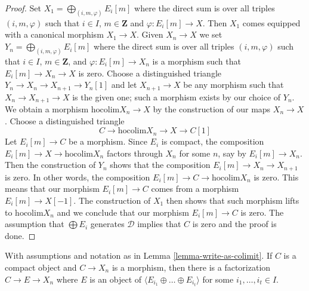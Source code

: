 \begin{proof}
Set $X_1 = \bigoplus_{(i, m, \varphi)} E_i[m]$ where the direct sum is over
all triples $(i, m, \varphi)$ such that $i \in I$, $m \in \mathbf{Z}$
and $\varphi : E_i[m] \to X$. Then $X_1$ comes equipped with a canonical
morphism $X_1 \to X$. Given $X_n \to X$ we set
$Y_n = \bigoplus_{(i, m, \varphi)} E_i[m]$ where the direct sum is over
all triples $(i, m, \varphi)$ such that $i \in I$, $m \in \mathbf{Z}$, and
$\varphi : E_i[m] \to X_n$ is a morphism such that $E_i[m] \to X_n \to X$
is zero. Choose a distinguished triangle
$Y_n \to X_n \to X_{n + 1} \to Y_n[1]$
and let $X_{n + 1} \to X$ be any morphism such that $X_n \to X_{n + 1} \to X$
is the given one; such a morphism exists by our choice of $Y_n$.
We obtain a morphism $\text{hocolim} X_n \to X$ by the construction
of our maps $X_n \to X$. Choose a distinguished triangle
$$
C \to \text{hocolim} X_n \to X \to C[1]
$$
Let $E_i[m] \to C$ be a morphism. Since $E_i$ is compact, the
composition $E_i[m] \to X \to \text{hocolim} X_n$ factors through
$X_n$ for some $n$, say by $E_i[m] \to X_n$. Then the
construction of $Y_n$ shows that the composition
$E_i[m] \to X_n \to X_{n + 1}$ is zero. In other words, the composition
$E_i[m] \to C \to \text{hocolim} X_n$ is zero. This means that our
morphism $E_i[m] \to C$ comes from a morphism $E_i[m] \to X[-1]$.
The construction of $X_1$ then shows that such morphism lifts to
$\text{hocolim} X_n$ and we conclude that our morphism $E_i[m] \to C$
is zero. The assumption that $\bigoplus E_i$ generates $\mathcal{D}$
implies that $C$ is zero and the proof is done.
\end{proof}

\begin{lemma}
\label{lemma-factor-through}
With assumptions and notation as in Lemma \ref{lemma-write-as-colimit}.
If $C$ is a compact object and $C \to X_n$ is a morphism, then
there is a factorization $C \to E \to X_n$ where
$E$ is an object of $\langle E_{i_1} \oplus \ldots \oplus E_{i_t} \rangle$
for some $i_1, \ldots, i_t \in I$.
\end{lemma}


